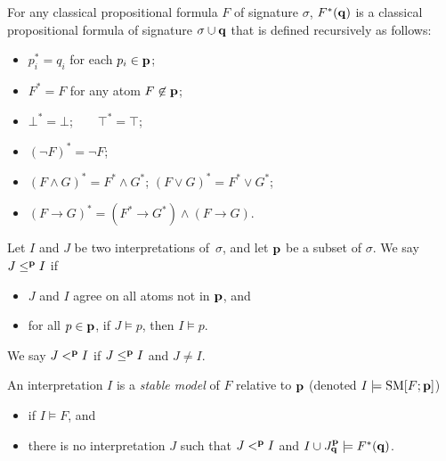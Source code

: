\documentclass[runningheads]{llncs}
\def\bi{\begin{itemize}}
\def\ei{\end{itemize}}
\def\sm{\hbox{\rm SM}}
\def\rar{\rightarrow}
\begin{document}

For any classical propositional formula $F$ of signature $\sigma$,
$F^*({\bf q})$ is a classical propositional formula of signature
$\sigma\cup{\bf q}$ that is defined recursively as follows: 
\begin{itemize}
\item  $p_i^* = q_i$ for each $p_i\in{\bf p}$; 
\item  $F^* = F$ for any atom $F\not\in {\bf p}$; 
\item  $\bot^* = \bot$;\ \ \ \  $\top^* = \top$; 
\item  $(\neg F)^* = \neg F$;
\item  $(F\land G)^* = F^* \land G^*$; \qquad
       $(F\lor G)^* = F^* \lor G^*$;
\item  $(F\rar G)^* = (F^* \rar G^*)\land (F \rar G)$.
\end{itemize}

Let $I$ and $J$ be two interpretations of~$\sigma$, and let ${\bf p}$
be a subset of $\sigma$. We say $J\le^{\bf p} I$ if 
\begin{itemize}
\item  $J$ and $I$ agree on all atoms not in ${\bf p}$, and
\item  for all $p\in {\bf p}$, if $J\models p$, then $I\models p$.
\end{itemize}
We say $J<^{\bf p} I$ if $J\le^{\bf p} I$ and $J\ne I$.




\begin{definition}\label{def:cl-sm}
An interpretation $I$ is a {\em stable model} of $F$ relative to
${\bf p}$ (denoted $I\models\sm[F; {\bf p}]$) 
\bi
\item if $I\models F$, and
\item there is no interpretation $J$ such that $J<^{\bf p} I$ and $I\cup J^{\bf p}_{\bf q}\models F^*({\bf q})$.
\ei
\end{definition}
\end{document}
